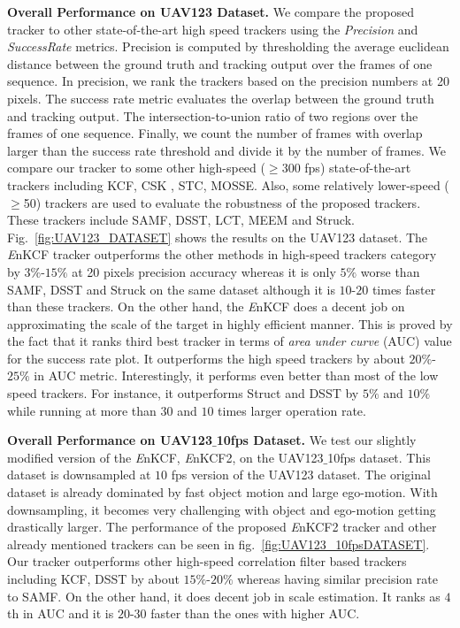 \documentclass{bmvc2k}
\begin{document}
\textbf{Overall Performance on UAV123 Dataset.}
We compare the proposed tracker to other state-of-the-art high speed
trackers using the \textit{Precision} and \textit{Success\:Rate}
metrics. Precision is computed by thresholding the average euclidean
distance between the ground truth and tracking output over the frames
of one sequence. In precision, we rank the trackers based on the
precision numbers at 20 pixels. The success rate metric evaluates the
overlap between the ground truth and tracking output. The
intersection-to-union ratio of two regions over the frames of one
sequence. Finally, we count the number of frames with overlap larger
than the success rate threshold and divide it by the number of
frames. We compare our tracker to some other high-speed ($\geq$300
fps) state-of-the-art trackers including KCF\cite{henriques2015high},
CSK \cite{henriques2012exploiting}, STC\cite{zhang2014fast},
MOSSE\cite{bolme2010visual,henriques2015high}. Also, some relatively
lower-speed ($\geq$50) trackers are used to evaluate the robustness of
the proposed trackers. These trackers include SAMF\cite{li2014scale},
DSST\cite{danelljan2014accurate}, LCT\cite{ma2015long},
MEEM\cite{zhang2014meem} and Struck\cite{hare2012efficient}.
Fig.~\ref{fig:UAV123_DATASET} shows the results on the UAV123
dataset. The {\it E}nKCF tracker outperforms the other methods in
high-speed trackers category by $3\%$-$15\%$ at 20 pixels precision
accuracy whereas it is only $5\%$ worse than SAMF, DSST and Struck on
the same dataset although it is $10$-$20$ times faster than these
trackers. On the other hand, the {\it E}nKCF does a decent job on
approximating the scale of the target in highly efficient manner. This
is proved by the fact that it ranks third best tracker in terms of
\textit{area under curve} (AUC) value for the success rate plot. It
outperforms the high speed trackers by about $20\%$-$25\%$ in AUC
metric. Interestingly, it performs even better than most of the low
speed trackers. For instance, it outperforms Struct and DSST by $5\%$
and $10\%$ while running at more than $30$ and $10$ times larger
operation rate.

\textbf{Overall Performance on UAV123$\_$10fps Dataset.} We test our
slightly modified version of the {\it E}nKCF, {\it E}nKCF2, on the
UAV123$\_$10fps dataset. This dataset is downsampled at $10$ fps
version of the UAV123 dataset. The original dataset is already
dominated by fast object motion and large ego-motion. With
downsampling, it becomes very challenging with object and ego-motion
getting drastically larger. The performance of the proposed {\it
  E}nKCF2 tracker and other already mentioned trackers can be seen in
fig.~\ref{fig:UAV123_10fpsDATASET}. Our tracker outperforms other
high-speed correlation filter based trackers including KCF, DSST by
about $15\%$-$20\%$ whereas having similar precision rate to SAMF. On
the other hand, it does decent job in scale estimation. It ranks as
$4$th in AUC and it is $20$-$30$ faster than the ones with
higher AUC.
\end{document}
